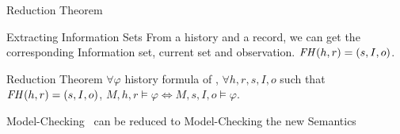 \begin{frame}{Reduction Theorem}

  \begin{block}{Extracting Information Sets}
    From a history and a record, we can get the corresponding Information set, current set and observation. $\mathit{FH}(h,r)=(s,I,o)$.
  \end{block}
  \vfill
  \begin{block}{Reduction Theorem}
    $\forall\varphi$ history formula of \ctlskd, $\forall h,r,s,I,o$ such that\\ $\mathit{FH}(h,r)=(s,I,o)$, \quad$M,h,r\models\varphi\iff M,s,I,o\models\varphi$.
  \end{block}
  \vfill
  \begin{exampleblock}{Model-Checking \ctlskd\ can be reduced to Model-Checking the new Semantics}
  \end{exampleblock}
\end{frame}


